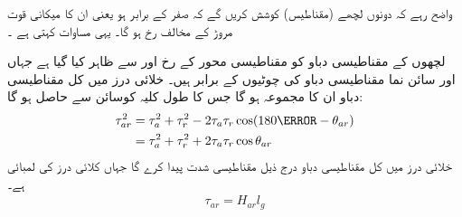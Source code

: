 واضح رہے کہ  دونوں لچھے (مقناطیس) کوشش کریں گے کہ  صفر کے برابر ہو یعنی ان کا میکانی قوت مروڑ   کے مخالف رخ ہو گا۔ یہی مساوات   کہتی  ہے ۔

لچھوں  کے مقناطیسی دباو کو  مقناطیسی محور کے رخ   اور  سے ظاہر کیا گیا ہے  جہاں  اور  سائن نما مقناطیسی دباو کی چوٹیوں کے برابر ہیں۔   خلائی درز میں کل مقناطیسی دباو  ان  کا مجموعہ ہو گا جس کا طول  کلیہ کوسائن   سے حاصل ہو گا:
\begin{gather}
\begin{aligned}\label{مساوات_گھومتے_مشین_مربع_کل_دباو}
\tau_{ar}^2&=\tau_a^2+\tau_r^2-2\tau_a \tau_r \cos (180\degree-\theta_{ar})\\
&=\tau_a^2+\tau_r^2+2\tau_a \tau_r \cos \theta_{ar}
\end{aligned}
\end{gather}
خلائی درز میں کل مقناطیسی دباو  درج ذیل مقناطیسی شدت  پیدا کرے گا جہاں  کلائی درز کی لمبائی ہے۔
\begin{align}
\tau_{ar}=H_{ar} l_g
\end{align}

